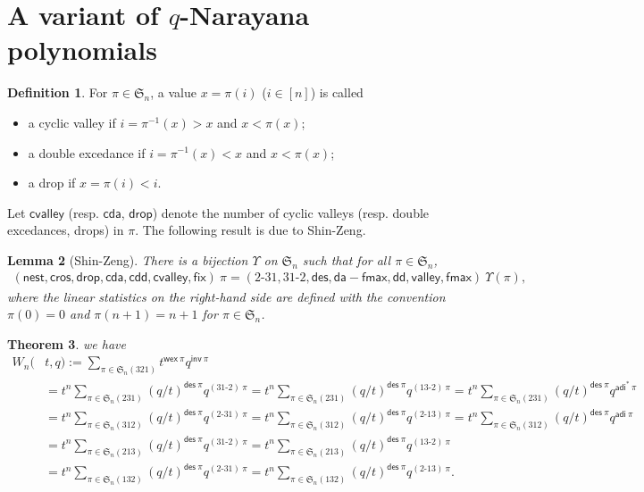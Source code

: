 \documentclass[12pt,reqno]{amsart}
\numberwithin{equation}{section}
\def\red{\textcolor{red}}
\theoremstyle{plain}
\newtheorem{theorem}{Theorem}[section]
\newtheorem{lemma}[theorem]{Lemma}
\theoremstyle{definition}
\newtheorem{Def}[theorem]{Definition}
\def\S{\mathfrak{S}}
\def\ai{\mathsf{adi}}
\def\da{\mathsf{da}}
\def\dd{\mathsf{dd}}
\def\des{\mathsf{des}}
\def\inv{\mathsf{inv}}
\def\fix{\mathsf{fix}}
\def\fmax{\mathsf{fmax}}
\def\nest{\mathsf{nest}}
\def\cros{\mathsf{cros}}
\def\wex{\mathsf{wex}}
\def\valley{\mathsf{valley}}
\def\cvalley{\mathsf{cvalley}}
\def\drop{\mathsf{drop}}
\def\cda{\mathsf{cda}}
\def\cdd{\mathsf{cdd}}
\def\cab{31\text{-}2}
\def\bca{2\text{-}31}
\def\acb{13\text{-}2}
\def\bac{2\text{-}13}
\begin{document}
\section{\texorpdfstring{A variant of $q$-Narayana polynomials}{}}\label{sec4: var-q-nara}
\begin{Def}\label{c-stat}
For $\pi\in\S_n$, a value $x=\pi(i)$ ($i\in[n]$) is called
\begin{itemize}
\item a cyclic valley if $i=\pi^{-1}(x)>x$ and $x<\pi(x)$;
\item a double excedance if $i=\pi^{-1}(x)<x$ and $x<\pi(x)$;
\item a drop if $x=\pi(i)<i$.
\end{itemize}
\end{Def}
Let $\cvalley$ (resp. $\cda$, $\drop$) denote the number of cyclic valleys (resp. double excedances, drops) in $\pi$. The following result is due to
Shin-Zeng\cite[Theorem~5]{SZ12}.
\begin{lemma}[Shin-Zeng]\label{SZ12_lem}
There is a bijection $\Upsilon$ on $\S_n$ such that for all $\pi\in \S_n$,
\begin{align*}
(\nest, \cros, \drop, \cda, \cdd, \cvalley, \fix)\:\pi=  (\bca, \cab, \des, \da-\fmax, \dd, \valley, \fmax)\:\Upsilon(\pi),
\end{align*}
where the linear statistics on the right-hand side are defined
with the convention $\pi(0)=0$ and $\pi(n+1)=n+1$ for $\pi\in \S_n$.
\end{lemma}

\begin{theorem}\label{HZthwex}
we have
\begin{align*}
W_n(&t, q):=\sum_{\pi\in\S_n(321)}t^{\wex\:\pi}q^{\inv\:\pi}\\
&=t^n\sum_{\pi\in\S_n(231)}(q/t)^{\des\:\pi}q^{(\cab)\:\pi}=t^n\sum_{\pi\in\S_n(231)}(q/t)^{\des\:\pi}q^{(\acb)\:\pi}=t^n\sum_{\pi\in\S_n(231)}(q/t)^{\des\:\pi}q^{\ai^*\:\pi}\\
&=t^n\sum_{\pi\in\S_n(312)}(q/t)^{\des\:\pi}q^{(\bca)\:\pi}=t^n\sum_{\pi\in\S_n(312)}(q/t)^{\des\:\pi}q^{(\bac)\:\pi}=t^n\sum_{\pi\in\S_n(312)}(q/t)^{\des\:\pi}q^{\ai\:\pi}\\
&=t^n\sum_{\pi\in\S_n(213)}(q/t)^{\des\:\pi}q^{(\cab)\:\pi}=t^n\sum_{\pi\in\S_n(213)}(q/t)^{\des\:\pi}q^{(\acb)\:\pi}\\
&=t^n\sum_{\pi\in\S_n(132)}(q/t)^{\des\:\pi}q^{(\bca)\:\pi}=t^n\sum_{\pi\in\S_n(132)}(q/t)^{\des\:\pi}q^{(\bac)\:\pi}.
\end{align*}
\end{theorem}
\end{document}
